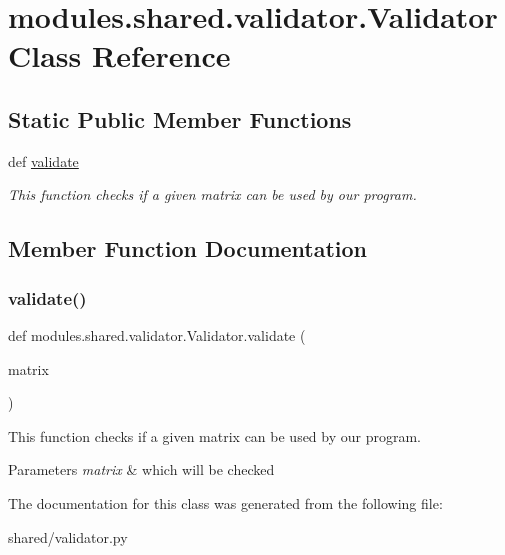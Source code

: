 \hypertarget{classmodules_1_1shared_1_1validator_1_1_validator}{}\section{modules.\+shared.\+validator.\+Validator Class Reference}
\label{classmodules_1_1shared_1_1validator_1_1_validator}
\subsection*{Static Public Member Functions}
\begin{DoxyCompactItemize}
\item 
def \mbox{\hyperlink{classmodules_1_1shared_1_1validator_1_1_validator_a5c2053342eeeffe53605742687e40b53}{validate}}
\begin{DoxyCompactList}\small\item\em This function checks if a given matrix can be used by our program. \end{DoxyCompactList}\end{DoxyCompactItemize}


\subsection{Member Function Documentation}
\mbox{\label{classmodules_1_1shared_1_1validator_1_1_validator_a5c2053342eeeffe53605742687e40b53}} 
\subsubsection{\texorpdfstring{validate()}{validate()}}
{\footnotesize\ttfamily def modules.\+shared.\+validator.\+Validator.\+validate (\begin{DoxyParamCaption}\item[{}]{matrix }\end{DoxyParamCaption})\hspace{0.3cm}{\ttfamily [static]}}



This function checks if a given matrix can be used by our program. 


\begin{DoxyParams}{Parameters}
{\em matrix} & which will be checked \\
\hline
\end{DoxyParams}


The documentation for this class was generated from the following file\+:\begin{DoxyCompactItemize}
\item 
shared/validator.\+py\end{DoxyCompactItemize}
